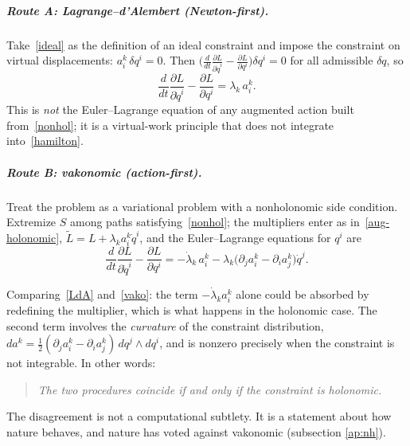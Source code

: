 \subparagraph{Route A: Lagrange--d'Alembert (Newton-first).}
Take~\eqref{ideal} as the definition of an ideal constraint and impose the
constraint on virtual displacements:
$a^k_i\,\delta q^i=0$. Then
$\bigl(\frac{d}{dt}\frac{\partial L}{\partial\dot q^i}-\frac{\partial L}{\partial q^i}\bigr)\delta q^i=0$
for all admissible $\delta q$, so
\begin{equation}
  \frac{d}{dt}\frac{\partial L}{\partial\dot q^i}-\frac{\partial L}{\partial q^i}
  =\lambda_k\,a^k_i .
  \label{LdA}
\end{equation}
This is \emph{not} the Euler--Lagrange equation of any augmented action built
from~\eqref{nonhol}; it is a virtual-work principle that does not
integrate into~\eqref{hamilton}.

\subparagraph{Route B: vakonomic (action-first).}
Treat the problem as a variational problem with a nonholonomic side
condition. Extremize $S$ among paths satisfying~\eqref{nonhol}; the
multipliers enter as in~\eqref{aug-holonomic},
$\tilde L=L+\lambda_k a^k_i\dot q^i$, and the Euler--Lagrange equations
for $q^i$ are
\begin{equation}
  \frac{d}{dt}\frac{\partial L}{\partial\dot q^i}-\frac{\partial L}{\partial q^i}
  =-\dot\lambda_k\,a^k_i-\lambda_k\bigl(\partial_ja^k_i-\partial_ia^k_j\bigr)\dot q^j .
  \label{vako}
\end{equation}

Comparing~\eqref{LdA} and~\eqref{vako}: the term $-\dot\lambda_ka^k_i$
alone could be absorbed by redefining the multiplier, which is what happens
in the holonomic case. The second term involves the \emph{curvature} of the
constraint distribution, $d a^k=\tfrac12(\partial_ja^k_i-\partial_ia^k_j)\,dq^j\wedge dq^i$,
and is nonzero precisely when the constraint is not integrable. In other
words:
\begin{quote}
\emph{The two procedures coincide if and only if the constraint is
holonomic.}
\end{quote}
The disagreement is not a computational subtlety. It is a statement about
how nature behaves, and nature has voted against vakonomic (subsection \ref{ap:nh}).


